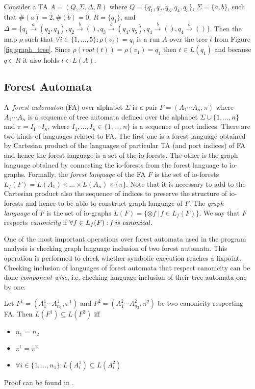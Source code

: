 \bexmp
Consider a TA $A=(Q,\Sigma,\Delta, R)$
where $Q=\{q_1,q_2,q_3,q_4,q_5\}$, $\Sigma = \{a,b\}$,
such that $\#(a) = 2, \#(b) =0$, $R=\{q_1\}$,
and $\Delta=\{q_1 \xrightarrow{a} (q_2,q_3), q_2 \xrightarrow{b} (),
q_3 \xrightarrow{b} (q_4,q_5), q_4 \xrightarrow{b} (), q_4 \xrightarrow{b} ()\}$.
Then the map $\rho$ such that $\forall i \in \{1,\ldots,5\}: \rho(v_i) = q_i$
is a run $A$ over the tree $t$ from Figure \ref{fig:graph_tree}.
Since $\rho(root(t)) = \rho(v_1) = q_1$ then $t \in L(q_1)$ and because $q \in R$
it also holds $t \in L(A)$.
\label{ex:ta}
\eexmp

\subsection{Forest Automata}
\label{subsec:fa}

A~\emph{forest automaton} (FA) over alphabet $\Sigma$ is a pair $F=(A_1\cdots A_n, \pi)$
where $A_1 \cdots A_n$ is a sequence of tree automata defined over the alphabet $\Sigma \cup \{1,\ldots,n\}$
and $\pi = I_1 \cdots I_n$, where $I_1,\ldots, I_n \in \{1, \ldots, n\}$ is a sequence of port indices.
There are two kinds of languages related to FA.
The first one is a forest language obtained by Cartesian product of the languages of particular TA (and port indices) of FA
and hence the forest language is a set of the io-forests.
The other is the graph language obtained by connecting the io-forests from the forest language to io-graphs.
Formally, the \emph{forest language} of the FA $F$ is the set of io-forests $L_f(F)= L(A_1) \times \ldots \times L(A_n) \times \{\pi\}$.
Note that it is necessary to add to the Cartesian product also the sequence of indices to preserve the structure of io-forests
and hence to be able to construct graph language of $F$.%
The \emph{graph language} of $F$ is the set of io-graphs $L(F) = \{\otimes f\,|\, f \in L_f(F)\}$.
We say that $F$ respects \emph{canonicity} if $\forall f \in L_f(F): \emph{f is canonical}$.

One of the most important operations over forest automata used in the program analysis
is checking graph language inclusion of two forest automata.
This operation is performed to check whether symbolic execution reaches a fixpoint.
Checking inclusion of languages of forest automata that respect canonicity can be done \emph{component-wise},
i.e. checking language inclusion of their tree automata one by one.

\begin{lemma}
	Let $F^1 = (A_1^1\cdots A_{n_{1}}^1, \pi^1)$ and $F^2 = (A_1^2\cdots A_{n_{2}}^2, \pi^2)$
	be two canonicity respecting FA.
	Then $L(F^1) \subseteq L(F^2)$ iff
	\begin{itemize}
			\item $n_1$ = $n_2$
			\item $\pi^1 = \pi^2$
			\item $\forall i \in \{1,\ldots,n_1\}: L(A_i^1) \subseteq L(A_i^2)$
	\end{itemize}
\end{lemma}
Proof can be found in \cite{forester:techrep}.

